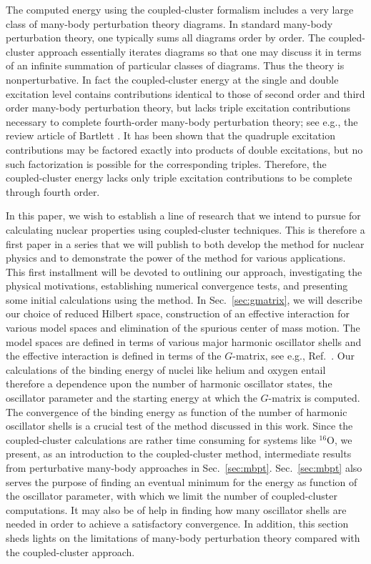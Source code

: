 \documentclass[aps,prc,twocolumn,floatfix]{revtex4}
\begin{document}
The computed energy using the coupled-cluster formalism includes 
a very large class of many-body perturbation theory diagrams.
In standard many-body perturbation theory, one typically sums 
all diagrams order by order. The coupled-cluster approach essentially
iterates diagrams so that one may discuss it in terms of an infinite 
summation of particular classes of diagrams.  Thus the theory is
nonperturbative. In fact the 
coupled-cluster energy at the single and double excitation level 
contains contributions identical to 
those of second order and third order many-body perturbation theory, but
lacks triple excitation contributions necessary to complete fourth-order
many-body perturbation theory; see e.g., the review article of 
Bartlett \cite{bartlett81}. It has been shown that the quadruple
excitation contributions may be factored exactly
into products of double excitations, but no such factorization is 
possible for the corresponding triples. Therefore, the coupled-cluster energy 
lacks only triple excitation contributions to be complete through 
fourth order.  

In this paper, we wish to establish a line of research that we
intend to pursue for calculating nuclear properties using coupled-cluster 
techniques. This is therefore a first paper in a series that 
we will publish to both develop the method for nuclear physics and to 
demonstrate the power of the method for various applications. This 
first installment will be devoted to outlining our approach, investigating
the physical motivations, establishing numerical convergence tests, and 
presenting some initial calculations using the method. 
In Sec.~\ref{sec:gmatrix},
we will describe our choice of reduced Hilbert space, 
construction of an effective interaction for various model spaces 
and elimination of the spurious center of mass motion. The model spaces
are defined in terms of various major harmonic oscillator shells and the 
effective interaction is defined in terms of the $G$-matrix,
see e.g., Ref.~\cite{hko95}. 
Our calculations of the binding energy of nuclei like helium and oxygen
entail therefore a dependence upon the number of harmonic oscillator states,
the oscillator parameter 
and the starting energy at which the $G$-matrix is computed. 
The convergence of the binding energy as function of the number of harmonic
oscillator shells  is a crucial test of the method discussed in this work. 
Since the coupled-cluster calculations are rather time consuming for systems
like $^{16}$O, we present, as an introduction to the coupled-cluster method, 
intermediate results from 
perturbative many-body approaches in Sec.~\ref{sec:mbpt}. 
Sec.~\ref{sec:mbpt} also
serves the purpose of finding an eventual minimum for the energy 
as function of the oscillator parameter, with which we limit the 
number of coupled-cluster computations. It may also be of help  
in finding  how many oscillator shells
are needed in order to achieve a satisfactory convergence. In addition, 
this section sheds lights on the limitations of many-body perturbation theory compared 
with the coupled-cluster approach.
\end{document}
